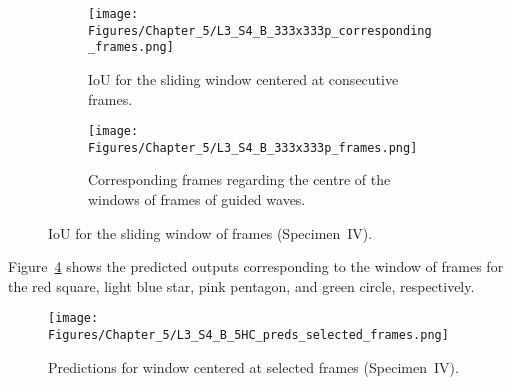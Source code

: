 \begin{figure} [!h]
	\centering
	\begin{subfigure}[b]{1\textwidth}
		\centering
		\texttt{[image: Figures/Chapter\_5/L3\_S4\_B\_333x333p\_corresponding\_frames.png]}
		\caption{IoU for the sliding window centered at consecutive frames.}
		\label{fig:L3_S4_B_333x333p_corresponding_frames}
	\end{subfigure}
	\par\medskip
	\begin{subfigure}[b]{1\textwidth}
		\centering
		\texttt{[image: Figures/Chapter\_5/L3\_S4\_B\_333x333p\_frames.png]}
		\caption{Corresponding frames regarding the centre of the windows of frames of guided waves.} 
		\label{fig:L3_S4_B_333x333p_frames}
	\end{subfigure}
	\caption{IoU for the sliding window of frames (Specimen~IV).}
	\label{fig:L3_S4_B_333x333p_50kHz_5HC_IoU_centre_window}
\end{figure} 

Figure~\ref{fig:L3_S4_B_5HC_preds_selected_frames} shows the predicted outputs corresponding to the window of frames for the red square, light blue star, pink pentagon, and green circle, respectively.
\begin{figure}[!ht]
	\centering
	\texttt{[image: Figures/Chapter\_5/L3\_S4\_B\_5HC\_preds\_selected\_frames.png]}
	\caption{Predictions for window centered at selected frames (Specimen~IV).}
	\label{fig:L3_S4_B_5HC_preds_selected_frames}
\end{figure}

